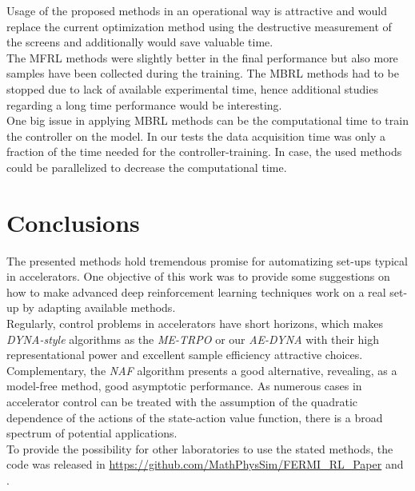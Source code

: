 \documentclass[
reprint,
amsmath,amssymb,amsfonts,clevref,
aps,
prstab,
]{revtex4-2}
\begin{document}
	Usage of the proposed methods in an operational way is attractive and would replace the current optimization method using the destructive measurement of the screens and additionally would save valuable time.\\ 
	The MFRL methods were slightly better in the final performance but also more samples have been collected during the training. The MBRL methods had to be stopped due to lack of available experimental time, hence additional studies regarding a long time performance would be interesting.\\ One big issue in applying MBRL methods can be the computational time to train the controller on the model. In our tests the data acquisition time was only a fraction of the time needed for the controller-training. In case, the used methods could be parallelized to decrease the computational time.
	
\section{Conclusions}
 The presented methods hold tremendous promise for automatizing set-ups typical in accelerators. One objective of this work was to provide some suggestions on how to make advanced deep reinforcement learning techniques work on a real set-up by adapting available methods.\\
Regularly, control problems in accelerators have short horizons, which makes \emph{DYNA-style} algorithms as the \emph{ME-TRPO} or our \emph{AE-DYNA} with their high representational power and excellent sample efficiency attractive choices.\\
Complementary, the \emph{NAF} algorithm presents a good alternative, revealing, as a model-free method, good asymptotic performance. As numerous cases in accelerator control can be treated with the assumption of the quadratic dependence of the actions of the state-action value function, there is a broad spectrum of potential applications.\\
 
 To provide the possibility for other laboratories to use the stated methods, the code was released in \url{https://github.com/MathPhysSim/FERMI_RL_Paper} and \cite{Hirlaender2020}.
 \vfill
 \newpage
 \vfill
 
 
 
 
 
  \newpage
	\appendix
\end{document}
